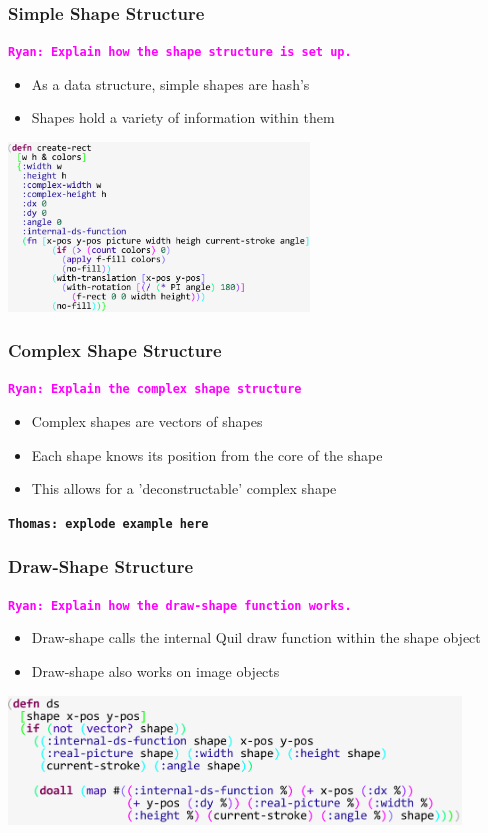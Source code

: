 \documentclass{beamer}
\newcommand{\comment}[1]{{\bf \tt  {#1}}}
\newcommand{\thcomment}[1]{\textcolor{BestBlue}{\comment{Thomas: {#1}}}}
\newcommand{\rmcomment}[1]{\textcolor{magenta}{\comment{Ryan: {#1}}}}
\begin{document}
\begin{frame}
\frametitle{Simple Shape Structure}
\rmcomment{Explain how the shape structure is set up.}
	\begin{itemize}
		\item As a data structure, simple shapes are hash's
		\item Shapes hold a variety of information within them
	\end{itemize}
	\includegraphics[width=8cm]{PresentationImages/rectHashmap.png}
\end{frame}

\begin{frame}
\frametitle{Complex Shape Structure}
\rmcomment{Explain the complex shape structure}
	\begin{itemize}
		\item Complex shapes are vectors of shapes
		\item Each shape knows its position from the core of the shape
		\item This allows for a 'deconstructable' complex shape
	\end{itemize}
	\thcomment{explode example here}
\end{frame}

\begin{frame}
\frametitle{Draw-Shape Structure}
\rmcomment{Explain how the draw-shape function works.}
	\begin{itemize}
		\item Draw-shape calls the internal Quil draw function within the shape object
		\item Draw-shape also works on image objects
	\end{itemize}
	\includegraphics[width=12cm]{PresentationImages/dsCode.png}
\end{frame}
\end{document}
